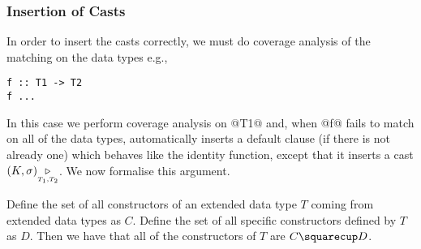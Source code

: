 \subsubsection{Insertion of Casts}

In order to insert the casts correctly, we must do coverage analysis of the
matching on the data types e.g.,
\begin{lstlisting}
f :: T1 -> T2
f ...
\end{lstlisting}
In this case we perform coverage analysis on @T1@ and, when @f@ fails to
match on all of the data types, automatically inserts a default clause (if
there is not already one) which behaves like the identity function, except
that it inserts a cast $(K,\sigma) {\underset{{\scriptscriptstyle T_1,T_2}}{\triangleright}}$. We
now formalise this argument.

Define the set of all constructors of an extended data type $T$ 
coming from extended data types as $C$. Define the set of all specific
constructors defined by $T$ as $D$. Then we have that all of the
constructors of $T$ are $C \squarecup D$.

